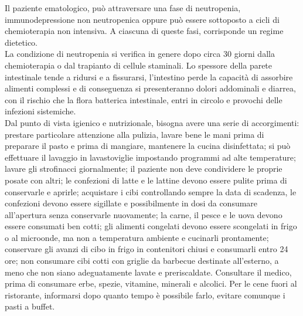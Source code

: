 Il paziente ematologico, può attraversare una fase di neutropenia, immunodepressione non neutropenica oppure può essere 
sottoposto a cicli di chemioterapia non intensiva\cite{DIETA}. A ciascuna di queste fasi, corrisponde un regime dietetico.\\
La condizione di neutropenia si verifica in genere dopo circa 30 giorni dalla chemioterapia o dal trapianto di 
cellule staminali. Lo spessore della parete intestinale tende a ridursi e a fissurarsi, l’intestino perde la capacità 
di assorbire alimenti complessi e di conseguenza si presenteranno dolori addominali e diarrea, con il 
rischio che la flora batterica intestinale, entri in circolo e provochi delle infezioni sistemiche.\\ Dal punto di vista 
igienico e nutrizionale, bisogna avere una serie di accorgimenti: prestare particolare attenzione alla 
pulizia, lavare bene le mani prima di preparare il pasto e prima di mangiare, mantenere la cucina disinfettata; si può 
effettuare il lavaggio in lavastoviglie impostando programmi ad alte temperature;
lavare gli strofinacci giornalmente; il paziente non deve condividere le proprie posate con altri; 
le confezioni di latte e le lattine devono essere pulite prima di conservarle e aprirle; 
acquistare i cibi controllando sempre la data di scadenza, le confezioni devono essere sigillate e possibilmente 
in dosi da consumare all’apertura senza conservarle nuovamente; 
la carne, il pesce e le uova devono essere consumati ben cotti; gli alimenti congelati devono essere scongelati in 
frigo o al microonde, ma non a temperatura ambiente e cucinarli prontamente; conservare gli avanzi di cibo 
in frigo in contenitori chiusi e consumarli entro 24 ore; 
non consumare cibi cotti con griglie da barbecue destinate all’esterno, a meno che 
non siano adeguatamente lavate e preriscaldate. Consultare il medico, prima di consumare erbe, spezie, vitamine, 
minerali e alcolici. Per le cene fuori al ristorante, informarsi dopo quanto tempo è possibile farlo, evitare comunque 
i pasti a buffet\cite{DIETA}.\\

